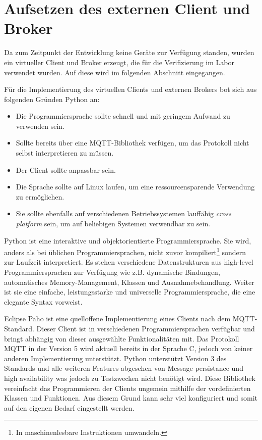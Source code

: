 \section{Aufsetzen des externen Client und Broker}
    Da zum Zeitpunkt der Entwicklung keine Geräte zur Verfügung standen, wurden ein virtueller Client und Broker erzeugt, die für die Verifizierung im Labor verwendet wurden.
    Auf diese wird im folgenden Abschnitt eingegangen.

    Für die Implementierung des virtuellen Clients und externen Brokers bot sich aus folgenden Gründen Python an:
    \begin{itemize}
        \item Die Programmiersprache sollte schnell und mit geringem Aufwand zu verwenden sein.
        \item Sollte bereits über eine \ac{MQTT}-Bibliothek verfügen, um das Protokoll nicht selbst interpretieren zu müssen.
        \item Der Client sollte anpassbar sein.
        \item Die Sprache sollte auf Linux laufen, um eine ressourcensparende Verwendung zu ermöglichen.
        \item Sie sollte ebenfalls auf verschiedenen Betriebssystemen lauffähig \emph{cross platform} sein, um auf beliebigen Systemen verwendbar zu sein.
    \end{itemize}
    Python ist eine interaktive und objektorientierte Programmiersprache. Sie wird, anders als bei üblichen Programmiersprachen, nicht zuvor kompiliert\footnote{In maschinenlesbare Instruktionen umwandeln.} sondern zur Laufzeit interpretiert.
    Es stehen verschiedene Datenstrukturen aus high-level Programmiersprachen zur Verfügung wie z.B. dynamische Bindungen, automatisches Memory-Management, Klassen und Ausnahmebehandlung. Weiter ist sie eine einfache, leistungsstarke und universelle Programmiersprache, die eine elegante Syntax vorweist. \cite{sanner1999python}
        
    Eclipse Paho ist eine quelloffene Implementierung eines Clients nach dem \ac{MQTT}-Standard. Dieser Client ist in verschiedenen Programmiersprachen verfügbar und bringt abhängig von dieser ausgewählte Funktionalitäten mit.
    Das Protokoll \ac{MQTT} in der Version 5 wird aktuell bereits in der Sprache C, jedoch von keiner anderen Implementierung unterstützt. Python unterstützt Version 3 des Standards und alle weiteren Features abgesehen von \glqq Message persistance\grqq{} und \glqq high availability\grqq{} was jedoch zu Testzwecken nicht benötigt wird. \cite{eclipse_foundation2017}
    Diese Bibliothek vereinfacht das Programmieren der Clients ungemein mithilfe der vordefinierten Klassen und Funktionen.
    Aus diesem Grund kann sehr viel konfiguriert und somit auf den eigenen Bedarf eingestellt werden. 

